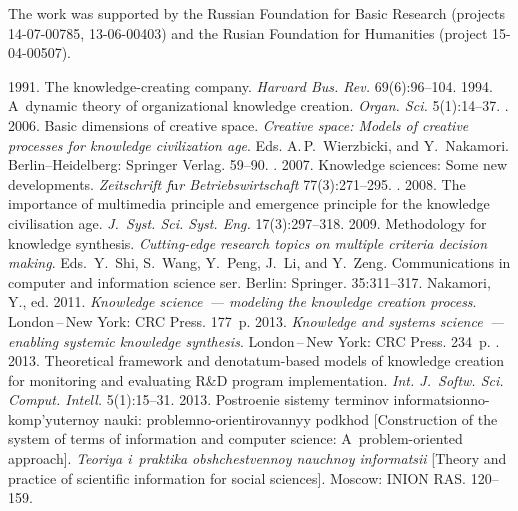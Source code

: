 {


\Ack
\noindent
The work was supported by the Russian Foundation for Basic Research 
(projects 14-07-00785, 13-06-00403) and the Rusian Foundation for Humanities 
(project 15-04-00507).


  \begin{multicols}{2}

\renewcommand{\bibname}{\protect\rmfamily References}

{\small\frenchspacing
 {%
 \begin{thebibliography}{99}
 1991. The knowledge-creating company. \textit{Harvard Bus. Rev.} 
69(6):96--104.
 1994. A~dynamic theory of organizational knowledge creation. 
\textit{Organ. Sci.} 5(1):14--37.
. 2006. Basic dimensions of creative space. 
\textit{Creative space: Models of creative processes for knowledge civilization age}. 
Eds. A.\,P.~Wierzbicki,  and
Y.~Nakamori. Berlin--Heidelberg: Springer Verlag. 59--90.
. 2007. Knowledge sciences: Some new 
developments. \textit{Zeitschrift f$\ddot{\mbox{u}}$r Betriebswirtschaft} 77(3):271--295.
. 2008. The importance of multimedia principle 
and emergence principle for the knowledge civilisation age. \textit{J.~Syst. Sci. Syst.
Eng.} 17(3):297--318.
 2009. Methodology for knowledge synthesis. \textit{Cutting-edge 
research topics on multiple criteria decision making}. 
Eds.\ Y.~Shi, S.~Wang, Y.~Peng, J.~Li, and Y.~Zeng. Communications in computer and 
information science ser. Berlin: Springer. 35:311--317.
Nakamori, Y., ed. 2011. \textit{Knowledge science~--- modeling the knowledge creation 
process}. London\,--\,New York: CRC Press. 177~p.
 2013. \textit{Knowledge and systems science~--- enabling systemic 
knowledge synthesis}. London\,--\,New York: CRC Press. 234~p.
. 2013. Theoretical framework and denotatum-based 
models of knowledge creation for monitoring and evaluating R\&D program implementation. 
\textit{Int. J.~Softw. Sci. Comput. Intell.} 5(1):15--31.
 2013. Postroenie sistemy terminov informatsionno-komp'yuternoy nauki: 
problemno-orientirovannyy podkhod [Construction of the system of terms of information and 
computer science: A~problem-oriented approach]. \textit{Teoriya i~praktika obshchestvennoy 
nauchnoy informatsii} [Theory and practice of scientific information for social sciences]. 
Moscow: INION RAS. 120--159.


\end{thebibliography}}}
\end{multicols}}
